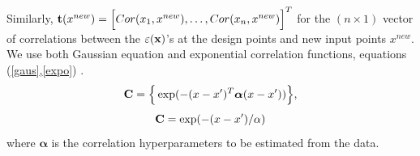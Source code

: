 Similarly, ${\bf t}(x^{new}) = \Big[Cor(x_1, x^{new}), \ldots,Cor(x_n, x^{new})\Big]^T$ for the $(n\times 1)$ vector of correlations between the $\varepsilon({\bf x})$'s at the design points and new input points $x^{new}$. We use both Gaussian equation and exponential correlation functions, equations (\ref{gaus},\ref{expo}) \citet{pd4,pd18,pd19}.
\begin{equation}\label{gaus}
\bC=\Big \{\exp(-(x-x')^T \boldsymbol \alpha (x-x')) \Big\},%
\end{equation}
\begin{equation}\label{expo}
{\bf C}= \exp(-(x-x')/\alpha)
\end{equation}
where $\boldsymbol \alpha$ is the correlation hyperparameters to be estimated from the data.

